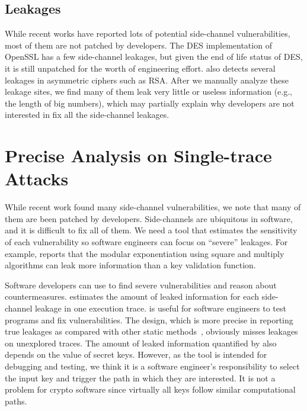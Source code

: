 \subsection*{Leakages} While recent works have reported lots of potential side-channel vulnerabilities, most of them are not patched by developers. The DES implementation of OpenSSL has a few side-channel leakages, but given the end of life status of DES, it is still unpatched for the worth of engineering effort. \detect{} also detects several leakages in asymmetric ciphers such as RSA. After we manually analyze these leakage sites, we find many of them leak very little or useless information (e.g., the length of big numbers), which may partially explain why developers are not interested in fix all the side-channel leakages. 

\section{Precise Analysis on Single-trace Attacks}
While recent work found many side-channel vulnerabilities,
we note that many of them are been patched by developers.
Side-channels are ubiquitous in software, and it is difficult to fix all of them.
We need a tool that estimates the sensitivity of each vulnerability
so software engineers can focus on
``severe'' leakages. For example, \tool{} reports that
the modular exponentiation using square and multiply algorithms can
leak more information than a key validation function.

Software developers can use \tool{} to find severe vulnerabilities
and reason about countermeasures.
\tool{} estimates the amount of leaked information for each side-channel leakage
in one execution trace. \tool{} is useful for software
engineers to test programs and fix vulnerabilities.
The design, which is more precise in reporting true leakages as compared with other static
methods~\cite{197207,BacelarAlmeida:2013:FVS:2483313.2483334}, obviously misses leakages on unexplored traces. The amount of leaked information quantified by \tool{} also depends on the value of secret keys.
However, as the tool is intended for debugging and testing,
we think it is a software engineer's responsibility to select the input key and trigger
the path in which they are interested. It is not a problem for crypto software 
since virtually all keys follow similar computational paths.

